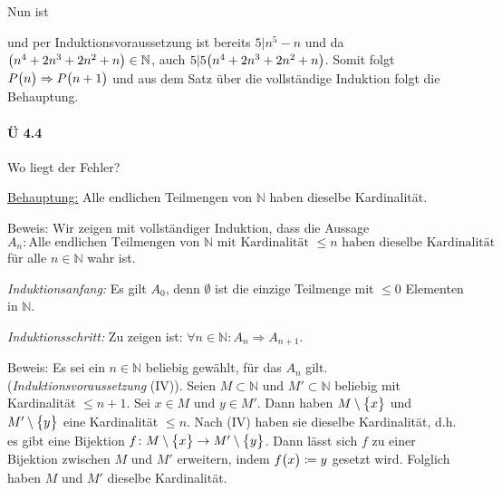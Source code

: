 \documentclass{scrreprt}
\begin{document}
\begin{enumerate}[(a)]
  Nun ist
  und per Induktionsvoraussetzung ist bereits $5 | n^5 - n$ und da
  $\qty\big(n^4 + 2n^3 + 2n^2 + n) \in \mathbb{N}$, auch
  $5 | 5\qty\big(n^4 + 2n^3 + 2n^2 + n)$.
  Somit folgt $P\qty\big(n) \Rightarrow P\qty\big(n + 1)$ und aus dem Satz
  über die vollständige Induktion folgt die Behauptung.
\end{enumerate}

\newpage
\paragraph{Ü 4.4} Wo liegt der Fehler?

\noindent
\underline{Behauptung:} Alle endlichen Teilmengen von $\mathbb{N}$ haben
dieselbe Kardinalität.

\noindent
Beweis: Wir zeigen mit vollständiger Induktion, dass die Aussage
\[
  A_n \colon \text{Alle endlichen Teilmengen von } \mathbb{N}
  \text{ mit Kardinalität } \leq n \text{ haben dieselbe Kardinalität}
\]
für alle $n \in \mathbb{N}$ wahr ist.

\noindent
\emph{Induktionsanfang:} Es gilt $A_0$, denn $\emptyset$ ist die einzige
Teilmenge mit $\leq 0$ Elementen in $\mathbb{N}$.

\noindent
\emph{Induktionsschritt:} Zu zeigen ist:
$\forall n \in \mathbb{N} \colon A_n \Rightarrow A_{n + 1}$.

\noindent
Beweis: Es sei ein $n \in \mathbb{N}$ beliebig gewählt, für das $A_n$ gilt.
(\emph{Induktionsvoraussetzung} (IV)).
Seien $M \subset \mathbb{N}$ und $M' \subset \mathbb{N}$ beliebig mit
Kardinalität $\leq n + 1$.
Sei $x \in M$ und $y \in M'$.
Dann haben $M \setminus \qty\big{x}$ und $M' \setminus \qty\big{y}$ eine
Kardinalität $\leq n$.
Nach (IV) haben sie dieselbe Kardinalität, d.h. es gibt eine Bijektion
$f \colon M \setminus \qty\big{x} \to M' \setminus \qty\big{y}$.
Dann lässt sich $f$ zu einer Bijektion zwischen $M$ und $M'$ erweitern,
indem $f\qty\big(x) \coloneqq y$ gesetzt wird.
Folglich haben $M$ und $M'$ dieselbe Kardinalität.
\end{document}
